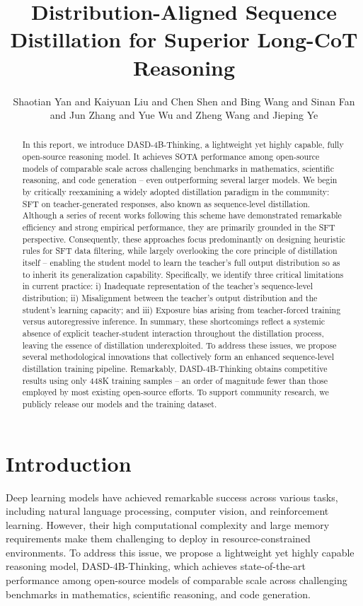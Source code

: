\documentclass{article}
\title{Distribution-Aligned Sequence Distillation for Superior Long-CoT Reasoning}
\author{Shaotian Yan and Kaiyuan Liu and Chen Shen and Bing Wang and Sinan Fan and Jun Zhang and Yue Wu and Zheng Wang and Jieping Ye}
\begin{document}
\maketitle

\begin{abstract}
In this report, we introduce DASD-4B-Thinking, a lightweight yet highly capable, fully open-source reasoning model. It achieves SOTA performance among open-source models of comparable scale across challenging benchmarks in mathematics, scientific reasoning, and code generation -- even outperforming several larger models. We begin by critically reexamining a widely adopted distillation paradigm in the community: SFT on teacher-generated responses, also known as sequence-level distillation. Although a series of recent works following this scheme have demonstrated remarkable efficiency and strong empirical performance, they are primarily grounded in the SFT perspective. Consequently, these approaches focus predominantly on designing heuristic rules for SFT data filtering, while largely overlooking the core principle of distillation itself -- enabling the student model to learn the teacher's full output distribution so as to inherit its generalization capability. Specifically, we identify three critical limitations in current practice: i) Inadequate representation of the teacher's sequence-level distribution; ii) Misalignment between the teacher's output distribution and the student's learning capacity; and iii) Exposure bias arising from teacher-forced training versus autoregressive inference. In summary, these shortcomings reflect a systemic absence of explicit teacher-student interaction throughout the distillation process, leaving the essence of distillation underexploited. To address these issues, we propose several methodological innovations that collectively form an enhanced sequence-level distillation training pipeline. Remarkably, DASD-4B-Thinking obtains competitive results using only 448K training samples -- an order of magnitude fewer than those employed by most existing open-source efforts. To support community research, we publicly release our models and the training dataset.
\end{abstract}

\section{Introduction}
Deep learning models have achieved remarkable success across various tasks, including natural language processing, computer vision, and reinforcement learning. However, their high computational complexity and large memory requirements make them challenging to deploy in resource-constrained environments. To address this issue, we propose a lightweight yet highly capable reasoning model, DASD-4B-Thinking, which achieves state-of-the-art performance among open-source models of comparable scale across challenging benchmarks in mathematics, scientific reasoning, and code generation.
\end{document}

